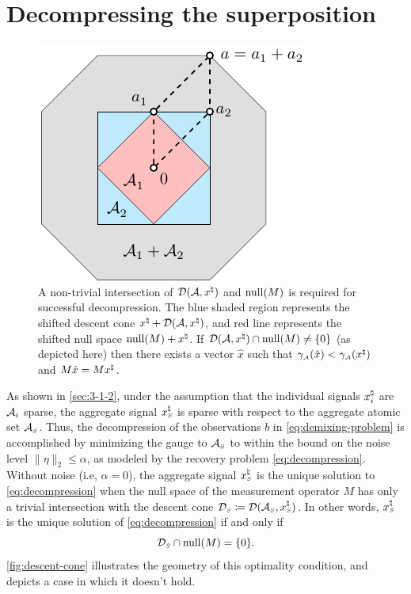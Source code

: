 \section{Decompressing the superposition}\label{sec:3-2} 

\begin{figure}[t]
    \centering
   \includegraphics[page=7]{./figures/illustrations2} 
  \caption{A non-trivial intersection of $\mathcal{D}(\mathcal{A}, x^{\natural})$ and $\operatorname{null}(M)$ is required for successful decompression. The blue shaded region represents the shifted descent cone $x^{\natural} + \mathcal{D}(\mathcal{A}, x^{\natural})$, and red line represents the shifted null space $\operatorname{null}(M) + x^{\natural}$. If $\mathcal{D}(\mathcal{A}, x^{\natural}) \cap \operatorname{null}(M) \neq \{0\}$ (as depicted here) then there exists a vector $\hat x$ such that  $\gamma_{\scriptscriptstyle\mathcal{A}}(\hat x) < \gamma_{\scriptscriptstyle\mathcal{A}}(x^{\natural})$ and $M\hat x = Mx^{\natural}$.\label{fig:descent-cone}}
\end{figure}

As shown in \autoref{sec:3-1-2}, under the assumption that the individual signals $x_i^{\natural}$ are $\mathcal{A}_i$ sparse, the aggregate signal $x_{\scriptscriptstyle S}^\natural$ is sparse with respect to the aggregate atomic set $\mathcal{A}_{\scriptscriptstyle S}$.
Thus, the decompression of the observations $b$ in \eqref{eq:demixing-problem} is accomplished by minimizing the gauge to $\mathcal{A}_{\scriptscriptstyle S}$ to within the bound on the noise level $\|\eta\|_2\le\alpha$, as modeled by the recovery problem \eqref{eq:decompression}.
Without noise (i.e, $\alpha=0$), the aggregate signal $x_{\scriptscriptstyle S}^\natural$ is the unique solution to \eqref{eq:decompression} when the null space of the measurement operator $M$ has only a trivial intersection with the descent cone $\mathcal{D}_{\scriptscriptstyle S}\coloneqq\mathcal{D}(\mathcal{A}_{\scriptscriptstyle S}, x_{\scriptscriptstyle S}^\natural)$.
In other words, $x_{\scriptscriptstyle S}^\natural$ is the unique solution of \eqref{eq:decompression} if and only if 
\begin{equation}\label{eq-unique-optimality}
  \mathcal{D}_{\scriptscriptstyle S}\cap\operatorname{null}(M) = \{0\}.  
\end{equation}
\autoref{fig:descent-cone} illustrates the geometry of this optimality condition, and depicts a case in which it doesn't hold.

